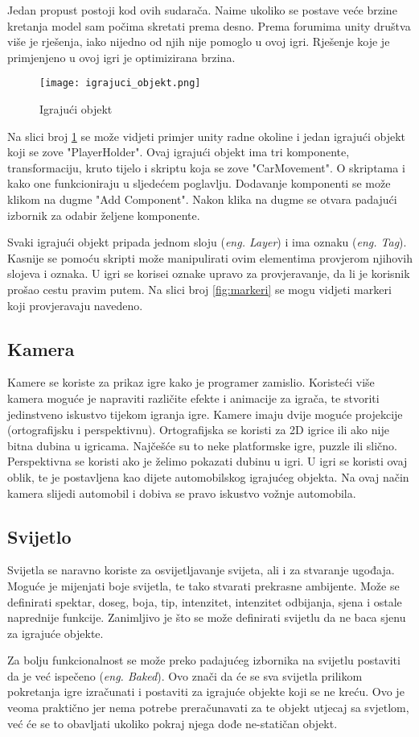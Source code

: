 Jedan propust postoji kod ovih sudarača. Naime ukoliko se postave veće brzine kretanja model sam počima skretati prema desno. Prema forumima unity društva više je rješenja, iako nijedno od njih nije pomoglo u ovoj igri. Rješenje koje je primjenjeno u ovoj igri je optimizirana brzina.

\begin{figure}[h]
	\texttt{[image: igrajuci\_objekt.png]}
	\centering
	\caption{Igrajući objekt}
	\label{fig:igrajuciobjekt}
\end{figure}
\newpage
Na slici broj \ref{fig:igrajuciobjekt} se može vidjeti primjer unity radne okoline i jedan igrajući objekt koji se zove "PlayerHolder". Ovaj igrajući objekt ima tri komponente, transformaciju, kruto tijelo i skriptu koja se zove "CarMovement". O skriptama i kako one funkcioniraju u sljedećem poglavlju. Dodavanje komponenti se može klikom na dugme "Add Component". Nakon klika na dugme se otvara padajući izbornik za odabir željene komponente. \par
Svaki igrajući objekt pripada jednom sloju (\emph{eng. Layer}) i ima oznaku (\emph{eng. Tag}). Kasnije se pomoću skripti može manipulirati ovim elementima provjerom njihovih slojeva i oznaka. U igri se korisei oznake upravo za provjeravanje, da li je korisnik prošao cestu pravim putem. Na slici broj \ref{fig:markeri} se mogu vidjeti markeri koji provjeravaju navedeno.
\subsection{Kamera}
Kamere se koriste za prikaz igre kako je programer zamislio. Koristeći više kamera moguće je napraviti različite efekte i animacije za igrača, te stvoriti jedinstveno iskustvo tijekom igranja igre. Kamere imaju dvije moguće projekcije (ortografijsku i perspektivnu). Ortografijska se koristi za 2D igrice ili ako nije bitna dubina u igricama. Najčešće su to neke platformske igre, puzzle ili slično. Perspektivna se koristi ako je želimo pokazati dubinu u igri. U igri se koristi ovaj oblik, te je postavljena kao dijete automobilskog igrajućeg objekta. Na ovaj način kamera slijedi automobil i dobiva se pravo iskustvo vožnje automobila.
\subsection{Svijetlo}
Svijetla se naravno koriste za osvijetljavanje svijeta, ali i za stvaranje ugođaja. Moguće je mijenjati boje svijetla, te tako stvarati prekrasne ambijente. Može se definirati spektar, doseg, boja, tip, intenzitet, intenzitet odbijanja, sjena i ostale naprednije funkcije. Zanimljivo je što se može definirati svijetlu da ne baca sjenu za igrajuće objekte. \par
Za bolju funkcionalnost se može preko padajućeg izbornika na svijetlu postaviti da je već ispečeno (\emph{eng. Baked}). Ovo znači da će se sva svijetla prilikom pokretanja igre izračunati i postaviti za igrajuće objekte koji se ne kreću. Ovo je veoma praktično jer nema potrebe preračunavati za te objekt utjecaj sa svjetlom, već će se to obavljati ukoliko pokraj njega dođe ne-statičan objekt.
